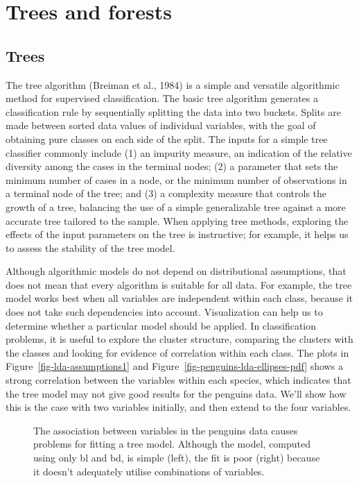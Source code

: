 \documentclass[
  letterpaper,
]{krantz}
\begin{document}
\chapter{Trees and forests}\label{sec-trees-forests}

\section{Trees}\label{sec-trees}


The tree algorithm (Breiman et al., 1984) is a simple and versatile
algorithmic method for supervised classification. The basic tree
algorithm generates a classification rule by sequentially splitting the
data into two buckets. Splits are made between sorted data values of
individual variables, with the goal of obtaining pure classes on each
side of the split. The inputs for a simple tree classifier commonly
include (1) an impurity measure, an indication of the relative diversity
among the cases in the terminal nodes; (2) a parameter that sets the
minimum number of cases in a node, or the minimum number of observations
in a terminal node of the tree; and (3) a complexity measure that
controls the growth of a tree, balancing the use of a simple
generalizable tree against a more accurate tree tailored to the sample.
When applying tree methods, exploring the effects of the input
parameters on the tree is instructive; for example, it helps us to
assess the stability of the tree model.

Although algorithmic models do not depend on distributional assumptions,
that does not mean that every algorithm is suitable for all data. For
example, the tree model works best when all variables are independent
within each class, because it does not take such dependencies into
account. Visualization can help us to determine whether a particular
model should be applied. In classification problems, it is useful to
explore the cluster structure, comparing the clusters with the classes
and looking for evidence of correlation within each class. The plots in
Figure~\ref{fig-lda-assumptions1} and
Figure~\ref{fig-penguins-lda-ellipses-pdf} shows a strong correlation
between the variables within each species, which indicates that the tree
model may not give good results for the penguins data. We'll show how
this is the case with two variables initially, and then extend to the
four variables.

\begin{figure}


\caption{\label{fig-p-bl-bd-tree}The association between variables in
the penguins data causes problems for fitting a tree model. Although the
model, computed using only bl and bd, is simple (left), the fit is poor
(right) because it doesn't adequately utilise combinations of
variables.}

\end{figure}%
\end{document}
